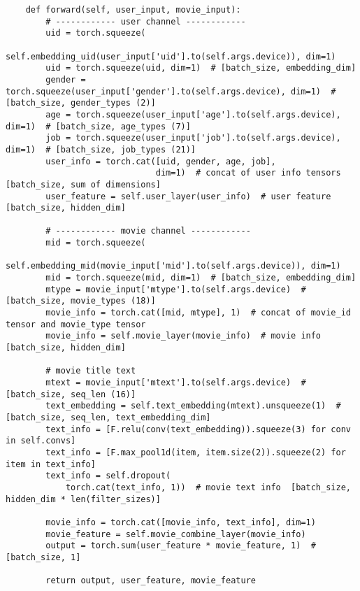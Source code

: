 \begin{spacing}{1.5}
\begin{lstlisting}
    def forward(self, user_input, movie_input):
        # ------------ user channel ------------
        uid = torch.squeeze(
            self.embedding_uid(user_input['uid'].to(self.args.device)), dim=1)
        uid = torch.squeeze(uid, dim=1)  # [batch_size, embedding_dim]
        gender = torch.squeeze(user_input['gender'].to(self.args.device), dim=1)  # [batch_size, gender_types (2)]
        age = torch.squeeze(user_input['age'].to(self.args.device), dim=1)  # [batch_size, age_types (7)]
        job = torch.squeeze(user_input['job'].to(self.args.device), dim=1)  # [batch_size, job_types (21)]
        user_info = torch.cat([uid, gender, age, job],
                              dim=1)  # concat of user info tensors  [batch_size, sum of dimensions]
        user_feature = self.user_layer(user_info)  # user feature  [batch_size, hidden_dim]
        
        # ------------ movie channel ------------
        mid = torch.squeeze(
            self.embedding_mid(movie_input['mid'].to(self.args.device)), dim=1)
        mid = torch.squeeze(mid, dim=1)  # [batch_size, embedding_dim]
        mtype = movie_input['mtype'].to(self.args.device)  # [batch_size, movie_types (18)]
        movie_info = torch.cat([mid, mtype], 1)  # concat of movie_id tensor and movie_type tensor
        movie_info = self.movie_layer(movie_info)  # movie info  [batch_size, hidden_dim]
        
        # movie title text
        mtext = movie_input['mtext'].to(self.args.device)  # [batch_size, seq_len (16)]
        text_embedding = self.text_embedding(mtext).unsqueeze(1)  # [batch_size, seq_len, text_embedding_dim]
        text_info = [F.relu(conv(text_embedding)).squeeze(3) for conv in self.convs]
        text_info = [F.max_pool1d(item, item.size(2)).squeeze(2) for item in text_info]
        text_info = self.dropout(
            torch.cat(text_info, 1))  # movie text info  [batch_size, hidden_dim * len(filter_sizes)]
        
        movie_info = torch.cat([movie_info, text_info], dim=1)
        movie_feature = self.movie_combine_layer(movie_info)
        output = torch.sum(user_feature * movie_feature, 1)  # [batch_size, 1]
        
        return output, user_feature, movie_feature
\end{lstlisting}\par
\end{spacing}

\clearpage


\printbibliography%
